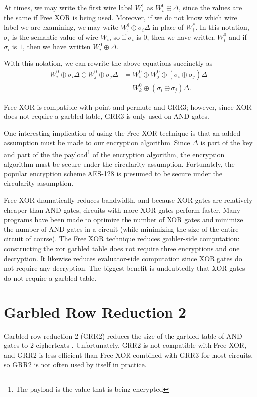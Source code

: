 At times, we may write the first wire label $W_i^1$ as $W_i^0 \oplus \Delta$, since the values are the same if Free XOR is being used. 
Moreover, if we do not know which wire label we are examining, we may write $W_i^0 \oplus \sigma_i \Delta$ in place of $W_i^*$. 
In this notation, $\sigma_i$ is the semantic value of wire $W_i$, so if $\sigma_i$ is $0$, then we have written $W_i^0$ and if $\sigma_i$ is $1$, then we have written $W_i^0 \oplus \Delta$.

With this notation, we can rewrite the above equations succinctly as
\begin{align*}
	W_i^0 \oplus \sigma_i \Delta \oplus W_j^0 \oplus \sigma_j \Delta & = W_i^0 \oplus W_j^0 \oplus (\sigma_i \oplus \sigma_j) \Delta \\
	& = W_k^0 \oplus (\sigma_i \oplus \sigma_j) \Delta.
\end{align*}

Free XOR is compatible with point and permute and GRR3; however, since XOR does not require a garbled table, GRR3 is only used on AND gates.

One interesting implication of using the Free XOR technique is that an added assumption must be made to our encryption algorithm.
Since $\Delta$ is part of the key and part of the the payload\footnote{The payload is the value that is being encrypted} of the encryption algorithm, the encryption algorithm must be secure under the circularity assumption.
Fortunately, the popular encryption scheme AES-128 is presumed to be secure under the circularity assumption.

Free XOR dramatically reduces bandwidth, and because XOR gates are relatively cheaper than AND gates, circuits with more XOR gates perform faster.
Many programs have been made to optimize the number of XOR gates and minimize the number of AND gates in a circuit (while minimizing the size of the entire circuit of course).
The Free XOR technique reduces garbler-side computation: constructing the xor garbled table does not require three encryptions and one decryption.
It likewise reduces evaluator-side computation  since XOR gates do not require any decryption. 
The biggest benefit is undoubtedly that XOR gates do not require a garbled table.

\section{Garbled Row Reduction 2}
Garbled row reduction 2 (GRR2) reduces the size of the garbled table of AND gates to $2$ ciphertexts \cite{grr}.
Unfortunately, GRR2 is not compatible with Free XOR, and GRR2 is less efficient than Free XOR combined with GRR3 for most circuits, so GRR2 is not often used by itself in practice.

